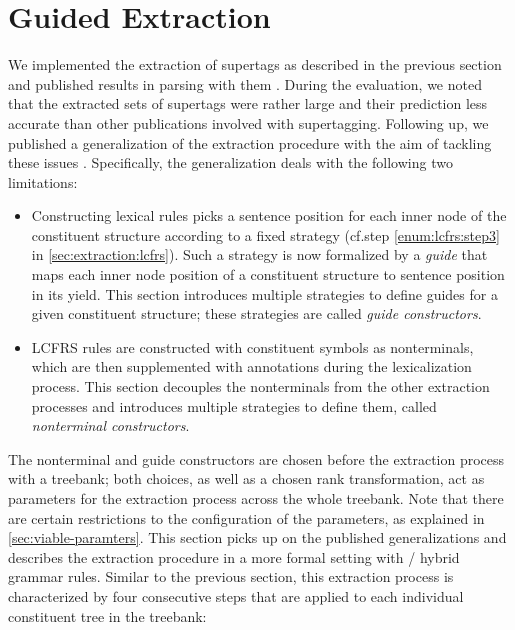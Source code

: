 \documentclass[../../document.tex]{subfiles}
\begin{document}
    \section{Guided Extraction} \label{sec:extraction:guided}
    We implemented the extraction of  supertags as described in the previous section and published results in parsing with them \citep{RupMoe21}.
    During the evaluation, we noted that the extracted sets of supertags were rather large and their prediction less accurate than other publications involved with supertagging.
    Following up, we published a generalization of the extraction procedure with the aim of tackling these issues \citep{Rup22}.
    Specifically, the generalization deals with the following two limitations:
    \begin{itemize}
        \item
            Constructing lexical  rules picks a sentence position for each inner node of the constituent structure according to a fixed strategy (cf.\@ step \ref{enum:lcfrs:step3} in \cref{sec:extraction:lcfrs}).
            Such a strategy is now formalized by a \emph{guide} that maps each inner node position of a constituent structure to sentence position in its yield.
            This section introduces multiple strategies to define guides for a given constituent structure; these strategies are called \emph{guide constructors}.
        \item
            LCFRS rules are constructed with constituent symbols as nonterminals, which are then supplemented with annotations during the lexicalization process.
            This section decouples the nonterminals from the other extraction processes and introduces multiple strategies to define them, called \emph{nonterminal constructors}.
    \end{itemize}
    The nonterminal and guide constructors are chosen before the extraction process with a treebank; both choices, as well as a chosen rank transformation, act as parameters for the extraction process across the whole treebank.
    Note that there are certain restrictions to the configuration of the parameters, as explained in \cref{sec:viable-paramters}.
    This section picks up on the published generalizations and describes the extraction procedure in a more formal setting with / hybrid grammar rules.
    Similar to the previous section, this extraction process is characterized by four consecutive steps that are applied to each individual constituent tree in the treebank:
\end{document}
